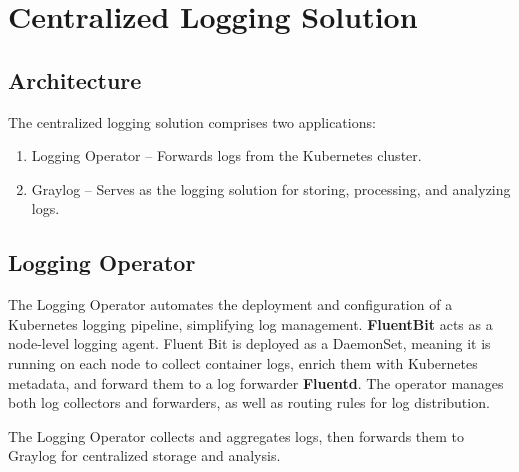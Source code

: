 \documentclass[../main.tex]{subfiles}
\begin{document}

\section{Centralized Logging Solution}

\subsection{Architecture}
The centralized logging solution comprises two applications:

\begin{enumerate}
    \item Logging Operator – Forwards logs from the Kubernetes cluster. 
    \item Graylog – Serves as the logging solution for storing, processing, and analyzing logs.
\end{enumerate}

\subsection{Logging Operator}

The Logging Operator \cite{logoperator} automates the deployment and configuration of a Kubernetes logging pipeline, simplifying log management. \textbf{FluentBit} acts as a node-level logging agent. Fluent Bit is deployed as a DaemonSet, meaning it is running on each node to collect container logs, enrich them with Kubernetes metadata, and forward them to a log forwarder \textbf{Fluentd}. The operator manages both log collectors and forwarders, as well as routing rules for log distribution.

The Logging Operator collects and aggregates logs, then forwards them to Graylog for centralized storage and analysis.
\end{document}
